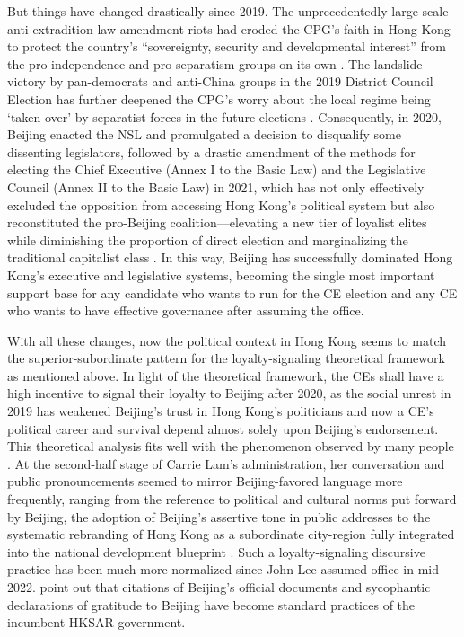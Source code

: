 \documentclass[9pt,a4paper,twocolumn,twoside]{rho-class/rho}
\begin{document}
        But things have changed drastically since 2019. The unprecedentedly large-scale anti-extradition law amendment riots had eroded the CPG's faith in Hong Kong to protect the 
        country's ``sovereignty, security and developmental interest'' from the pro-independence and pro-separatism groups on its own \parencite{hung2020unrest}. The landslide victory 
        by pan-democrats and anti-China groups in the 2019 District Council Election has further deepened the CPG's worry about the local regime being `taken over' by separatist forces 
        in the future elections \parencite{hung2020unrest}. Consequently, in 2020, Beijing enacted the NSL and promulgated a decision to disqualify some dissenting legislators, followed 
        by a drastic amendment of the methods for electing the Chief Executive (Annex I to the Basic Law) and the Legislative Council (Annex II to the Basic Law) in 2021, which has not 
        only effectively excluded the opposition from accessing Hong Kong's political system but also reconstituted the pro-Beijing coalition—elevating a new tier of loyalist elites 
        while diminishing the proportion of direct election and marginalizing the traditional capitalist class \parencite{kwong2025electoral}. In this way, Beijing has successfully 
        dominated Hong Kong's executive and legislative systems, becoming the single most important support base for any candidate who wants to run for the CE election and any CE who 
        wants to have effective governance after assuming the office.

        With all these changes, now the political context in Hong Kong seems to match the superior-subordinate pattern for the loyalty-signaling theoretical framework as mentioned above. 
        In light of the theoretical framework, the CEs shall have a high incentive to signal their loyalty to Beijing after 2020, as the social unrest in 2019 has weakened Beijing's 
        trust in Hong Kong's politicians and now a CE's political career and survival depend almost solely upon Beijing's endorsement. This theoretical analysis fits well with the 
        phenomenon observed by many people \parencite{li2022chinese, chan2023ccp}. At the second-half stage of Carrie Lam's administration, her conversation and public pronouncements 
        seemed to mirror Beijing-favored language more frequently, ranging from the reference to political and cultural norms put forward by Beijing, the adoption of Beijing's assertive 
        tone in public addresses to the systematic rebranding of Hong Kong as a subordinate city-region fully integrated into the national development blueprint \parencite{peck2024hongkong}. 
        Such a loyalty-signaling discursive practice has been much more normalized since John Lee assumed office in mid-2022. \textcite{deng2025legitimation} point out that citations 
        of Beijing's official documents and sycophantic declarations of gratitude to Beijing have become standard practices of the incumbent HKSAR government.
\end{document}
